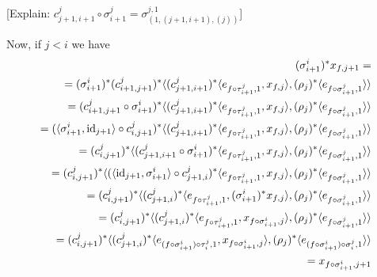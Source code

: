 [Explain: $c^j_{j+1, {i+1}} \circ \sigma^j_{i+1} = \sigma^{j, 1}_{(1, (j+1, i+1), (j))}$]

Now, if $j < i$ we have \begin{align*}(\sigma^i_{i+1})^* x_{f, j+1} =\\ =(\sigma^i_{i+1})^* (c^j_{i+1, j+1})^* \langle(c^j_{j+1, i+1})^* \langle e_{f \circ \tau^j_{i+1}, 1}, x_{f, j} \rangle, (\rho_{j})^* \langle e_{f \circ \sigma^j_{i+1}, 1} \rangle \rangle\\ = (c^j_{i+1, j+1} \circ \sigma^i_{i+1})^* \langle(c^j_{j+1, i+1})^* \langle e_{f \circ \tau^j_{i+1}, 1}, x_{f, j} \rangle, (\rho_{j})^* \langle e_{f \circ \sigma^j_{i+1}, 1} \rangle \rangle\\ = (\langle \sigma^i_{i+1}, \mathrm{id}_{j+1} \rangle \circ c^j_{i, j+1})^* \langle(c^j_{j+1, i+1})^* \langle e_{f \circ \tau^j_{i+1}, 1}, x_{f, j} \rangle, (\rho_{j})^* \langle e_{f \circ \sigma^j_{i+1}, 1} \rangle \rangle \\ = (c^j_{i, j+1})^* \langle (c^j_{j+1, i+1} \circ \sigma^i_{i+1})^* \langle e_{f \circ \tau^j_{i+1}, 1}, x_{f, j} \rangle, (\rho_{j})^* \langle e_{f \circ \sigma^j_{i+1}, 1} \rangle \rangle\\ = (c_{i, j+1}^j)^* \langle (\langle \mathrm{id}_{j+1}, \sigma^i_{i+1} \rangle \circ c^j_{j+1, i})^*  \langle e_{f \circ \tau^j_{i+1}, 1}, x_{f, j} \rangle, (\rho_{j})^* \langle e_{f \circ \sigma^j_{i+1}, 1} \rangle \rangle\\ = (c_{i, j+1}^j)^* \langle (c^j_{j+1, i})^* \langle e_{f \circ \tau^j_{i+1}, 1}, (\sigma^i_{i+1})^* x_{f, j} \rangle, (\rho_{j})^* \langle e_{f \circ \sigma^j_{i+1}, 1} \rangle \rangle \\ = (c_{i, j+1}^j)^* \langle (c^j_{j+1, i})^* \langle e_{f \circ \tau^j_{i+1}, 1}, x_{f \circ \sigma^i_{i+1}, j} \rangle, (\rho_{j})^* \langle e_{f \circ \sigma^j_{i+1}, 1} \rangle \rangle \\ = (c_{i, j+1}^j)^* \langle (c^j_{j+1, i})^* \langle e_{(f \circ \sigma^i_{i+1}) \circ \tau^j_i, 1}, x_{f \circ \sigma^i_{i+1}, j} \rangle, (\rho_{j})^* \langle e_{(f \circ \sigma^i_{i+1}) \circ \sigma^j_{i}, 1} \rangle \rangle \\ = x_{f \circ \sigma^i_{i+1}, j+1}
 \end{align*}

